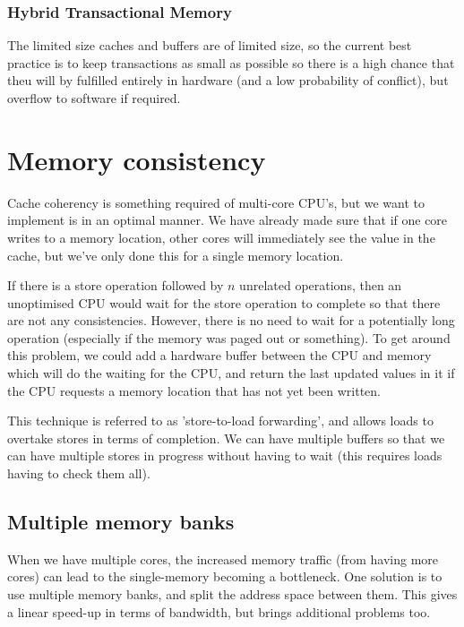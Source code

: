\subsubsection{Hybrid Transactional Memory}

The limited size caches and buffers are of limited size, so the
current best practice is to keep transactions as small as possible so
there is a high chance that theu will by fulfilled entirely in
hardware (and a low probability of conflict), but overflow to software
if required.



\section{Memory consistency}

Cache coherency is something required of multi-core CPU's, but we want
to implement is in an optimal manner. We have already made sure that
if one core writes to a memory location, other cores will immediately
see the value in the cache, but we've only done this for a single
memory location.

If there is a store operation followed by $n$ unrelated operations,
then an unoptimised CPU would wait for the store operation to complete
so that there are not any consistencies. However, there is no need to
wait for a potentially long operation (especially if the memory was
paged out or something). To get around this problem, we could add a
hardware buffer between the CPU and memory which will do the waiting
for the CPU, and return the last updated values in it if the CPU
requests a memory location that has not yet been written.

This technique is referred to as 'store-to-load forwarding', and
allows loads to overtake stores in terms of completion. We can have
multiple buffers so that we can have multiple stores in progress
without having to wait (this requires loads having to check them all).

\subsection{Multiple memory banks}

When we have multiple cores, the increased memory traffic (from having
more cores) can lead to the single-memory becoming a bottleneck. One
solution is to use multiple memory banks, and split the address space
between them. This gives a linear speed-up in terms of bandwidth, but
brings additional problems too.

